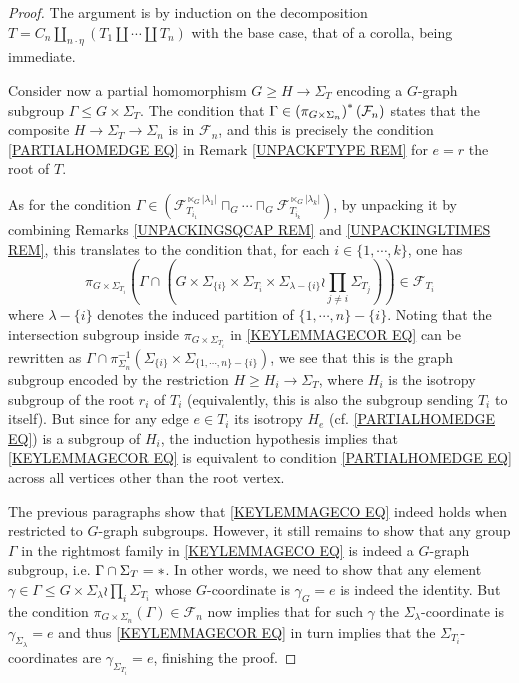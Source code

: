 \documentclass[a4paper,10pt
,draft
]{article}%
\numberwithin{equation}{section}
\numberwithin{figure}{section}
\theoremstyle{definition} %
\newcommand{\1}{\ensuremath{\mathbbm 1}}%
\begin{document}
\begin{proof} The argument is by induction on the decomposition
$T= C_n \amalg_{n \cdot \eta}(T_1 \amalg \cdots \amalg T_n)$
with the base case, that of a corolla, being immediate.

	Consider now a partial homomorphism $G \geq H \to \Sigma_T$ encoding a 
	$G$-graph subgroup $\Gamma \leq G \times \Sigma_T$.
	The condition that $\Gamma \in \left(\pi_{G \times \Sigma_n}\right)^{\**}(\mathcal{F}_n)$ states that the composite $H \to \Sigma_T \to \Sigma_n$ is in $\mathcal{F}_n$, 
	and this is precisely the condition \eqref{PARTIALHOMEDGE EQ} in Remark \ref{UNPACKFTYPE REM}
	for $e=r$ the root of $T$.

As for the condition 
	$ \Gamma \in 
	\left(
	\mathcal{F}_{T_{i_1}}^{\ltimes_G |\lambda_1|}
		\sqcap_G \cdots \sqcap_G
	\mathcal{F}_{T_{i_k}}^{\ltimes_G |\lambda_k|}
	\right)	$, by unpacking it by combining 
	Remarks \ref{UNPACKINGSQCAP REM} and 
	\ref{UNPACKINGLTIMES REM},
	this translates to the condition that, for each $i \in \{1,\cdots,k\}$, one has
	\begin{equation}\label{KEYLEMMAGECOR EQ}
	\pi_{G \times \Sigma_{T_i}}
	\left(
		\Gamma \cap 
	\left(
		G \times \Sigma_{\{i\}} \times \Sigma_{T_i}
		\times 
		\Sigma_{\lambda-\{i\}} \wr \prod_{j\neq i} \Sigma_{T_j}
	\right)
	\right)	
	\in \mathcal{F}_{T_i}
	\end{equation}
where $\lambda - \{i\}$ denotes the induced partition of 
$\{1,\cdots,n\} - \{i\}$. Noting that the intersection subgroup  inside $\pi_{G \times \Sigma_{T_i}}$ in \eqref{KEYLEMMAGECOR EQ} can be rewritten as 
$\Gamma \cap \pi_{\Sigma_n}^{-1}
(\Sigma_{\{i\}} \times \Sigma_{\{1,\cdots,n\} - \{i\}})$,
we see that this is the graph subgroup encoded by the restriction $H \geq H_i \to \Sigma_T$, where $H_i$ is the isotropy subgroup of the root $r_i$ of $T_i$ (equivalently, this is also the subgroup sending $T_i$ to itself).
But since for any edge $e \in T_i$ its isotropy $H_e$ 
(cf. \eqref{PARTIALHOMEDGE EQ}) is a subgroup of $H_i$, the induction hypothesis implies that \eqref{KEYLEMMAGECOR EQ}
is equivalent to condition \eqref{PARTIALHOMEDGE EQ} 
across all vertices other than the root vertex.

The previous paragraphs show that 
\eqref{KEYLEMMAGECO EQ}
indeed holds when restricted to $G$-graph subgroups. However, it still remains to show that any group $\Gamma$ in the rightmost family in \eqref{KEYLEMMAGECO EQ} is indeed
a $G$-graph subgroup, i.e. $\Gamma \cap \Sigma_T =\**$.
In other words, we need to show that any element 
$\gamma \in \Gamma \leq
G \times \Sigma_{\lambda} \wr \prod_{i} \Sigma_{T_i}$
whose $G$-coordinate is 
$\gamma_G = e$ is indeed the identity.
But the condition 
$\pi_{G \times \Sigma_n}(\Gamma) \in \mathcal{F}_n$ now implies that for such $\gamma$ the $\Sigma_{\lambda}$-coordinate is $\gamma_{\Sigma_{\lambda}} = e$
and thus \eqref{KEYLEMMAGECOR EQ} in turn implies that the 
$\Sigma_{T_i}$-coordinates are 
$\gamma_{\Sigma_{T_i}} = e$,
finishing the proof.
\end{proof}
\end{document}
